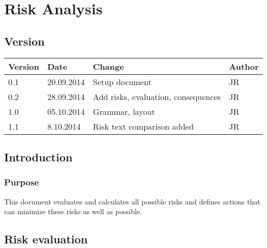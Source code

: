 
\chapter{Risk Analysis} %

\label{ChapterX} %



\section{Version}

\begin{tabular}{| p{1.5cm} | p{2cm} | p{9cm} | p{1.5cm} |}
	\hline
	Version & Date 		& Change & Author \\ \hline
	0.1 	& 20.09.2014 		& Setup document  										& JR \\ \hline
	0.2 	& 28.09.2014		& Add risks, evaluation, consequences					& JR \\ \hline
	1.0 	& 05.10.2014		& Grammar, layout 										& JR \\ \hline
	1.1 	& 8.10.2014			& Risk text comparison added  										& JR \\ \hline

\end{tabular}

\section{Introduction}

\subsection{Purpose}

This document evaluates and calculates all possible risks and defines actions that can minimize these risks as well as possible.

\section{Risk evaluation}

